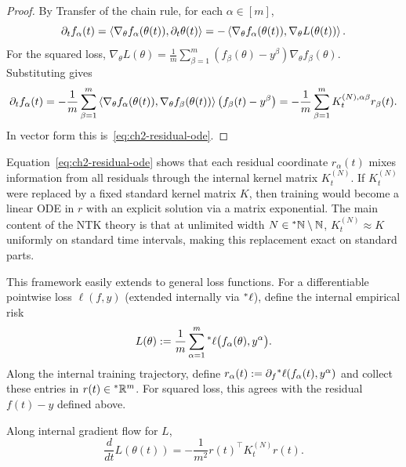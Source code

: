 \begin{proof}
By Transfer of the chain rule, for each $\alpha \in [m]$,
\begin{equation}\label{eq:ch2-res-ode-step1}
\partial_t f_\alpha(t) = \left\langle \nabla_\theta f_\alpha(\theta(t)), \partial_t \theta(t) \right\rangle = -\left\langle \nabla_\theta f_\alpha(\theta(t)), \nabla_\theta L(\theta(t)) \right\rangle.
\end{equation}
For the squared loss, $\nabla_\theta L(\theta) = \frac{1}{m} \sum_{\beta=1}^{m} (f_\beta(\theta) - y^\beta)\nabla_\theta f_\beta(\theta)$. Substituting gives
\begin{equation}\label{eq:ch2-res-ode-step2}
\partial_t f_\alpha(t) = -\frac{1}{m} \sum_{\beta=1}^{m} \left\langle \nabla_\theta f_\alpha(\theta(t)), \nabla_\theta f_\beta(\theta(t)) \right\rangle\bigl(f_\beta(t) - y^\beta\bigr) = -\frac{1}{m} \sum_{\beta=1}^{m} K_t^{(N),\alpha\beta} r_\beta(t).
\end{equation}
In vector form this is~\eqref{eq:ch2-residual-ode}.
\end{proof}

\begin{remark}\label{rem:ch2-residual-mixing}
Equation~\eqref{eq:ch2-residual-ode} shows that each residual coordinate $r_\alpha(t)$ mixes information from all residuals through the internal kernel matrix $K_t^{(N)}$. If $K_t^{(N)}$ were replaced by a fixed standard kernel matrix $K$, then training would become a linear ODE in $r$ with an explicit solution via a matrix exponential. The main content of the NTK theory is that at unlimited width $N \in {}^*\mathbb{N} \setminus \mathbb{N}$, $K_t^{(N)} \approx K$ uniformly on standard time intervals, making this replacement exact on standard parts.
\end{remark}

This framework easily extends to general loss functions. For a differentiable pointwise loss $\ell(f, y)$ (extended internally via ${}^*\ell$), define the internal empirical risk
\begin{equation}\label{eq:ch2-general-risk}
L(\theta) := \frac{1}{m} \sum_{\alpha=1}^{m} {}^*\ell\bigl(f_\alpha(\theta), y^\alpha\bigr).
\end{equation}
Along the internal training trajectory, define $r_\alpha(t) := \partial_f {}^*\ell(f_\alpha(t), y^\alpha)$ and collect these entries in $r(t) \in {}^*\mathbb{R}^m$. For squared loss, this agrees with the residual $f(t) - y$ defined above.

\begin{proposition}\label{prop:ch2-risk-dissipation}
Along internal gradient flow for $L$,
\begin{equation}\label{eq:ch2-risk-dissipation}
\frac{d}{dt} L(\theta(t)) = -\frac{1}{m^2} r(t)^\top K_t^{(N)} r(t).
\end{equation}
\end{proposition}

